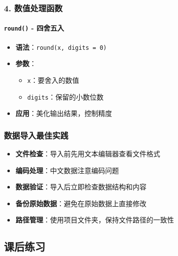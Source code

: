 \documentclass[
  twoside]{book}
\providecommand{\tightlist}{%
  \setlength{\itemsep}{0pt}\setlength{\parskip}{0pt}}
\begin{document}
\hypertarget{ux6570ux503cux5904ux7406ux51fdux6570}{%
\subsubsection{4. 数值处理函数}\label{ux6570ux503cux5904ux7406ux51fdux6570}}

\hypertarget{round---ux56dbux820dux4e94ux5165}{%
\paragraph{\texorpdfstring{\texttt{round()} - 四舍五入}{round() - 四舍五入}}\label{round---ux56dbux820dux4e94ux5165}}

\begin{itemize}
\tightlist
\item
  \textbf{语法}：\texttt{round(x,\ digits\ =\ 0)}
\item
  \textbf{参数}：

  \begin{itemize}
  \tightlist
  \item
    \texttt{x}：要舍入的数值
  \item
    \texttt{digits}：保留的小数位数
  \end{itemize}
\item
  \textbf{应用}：美化输出结果，控制精度
\end{itemize}

\hypertarget{ux6570ux636eux5bfcux5165ux6700ux4f73ux5b9eux8df5}{%
\subsubsection{数据导入最佳实践}\label{ux6570ux636eux5bfcux5165ux6700ux4f73ux5b9eux8df5}}

\begin{itemize}
\tightlist
\item
  \textbf{文件检查}：导入前先用文本编辑器查看文件格式
\item
  \textbf{编码处理}：中文数据注意编码问题
\item
  \textbf{数据验证}：导入后立即检查数据结构和内容
\item
  \textbf{备份原始数据}：避免在原始数据上直接修改
\item
  \textbf{路径管理}：使用项目文件夹，保持文件路径的一致性
\end{itemize}

\hypertarget{ux8bfeux540eux7ec3ux4e60-4}{%
\subsection{课后练习}\label{ux8bfeux540eux7ec3ux4e60-4}}
\end{document}
